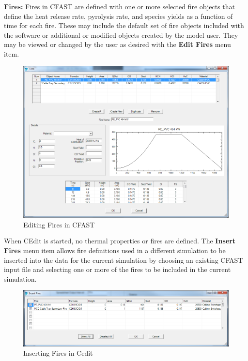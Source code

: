 \newpage

\textbf{Fires:} Fires in CFAST are defined with one or more selected fire objects that define the heat release rate, pyrolysis rate, and species yields as a function of time for each fire.  These may include the default set of fire objects included with the software or additional or modified objects created by the model user. They may be viewed or changed by the user as desired with the \textbf{Edit Fires} menu item.

\begin{figure}[h!]
\begin{center}
\includegraphics[width=6.5in]{FIGURES/Running_CFAST/Fire_Objects_Edit}
Editing Fires in CFAST
\end{center}
\end{figure}
\newpage

When CEdit is started, no thermal properties or fires are defined.  The \textbf{Insert Fires} menu item allows fire definitions used in a different simulation to be inserted into the data for the current simulation by choosing an existing CFAST input file and selecting one or more of the fires to be included in the current simulation.

\begin{figure}[h!]
\begin{center}
\includegraphics[width=6.5in]{FIGURES/Running_CFAST/Fire_Objects_Insert}
Inserting Fires in Cedit
\end{center}
\end{figure}

